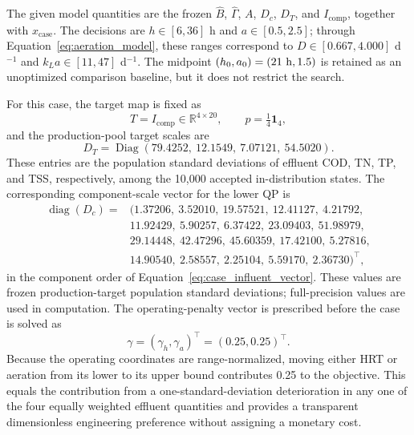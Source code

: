 \documentclass[a4paper,fleqn]{cas-sc}
\newcommand{\R}{\mathbb{R}}
\begin{document}
The given model quantities are the frozen $\widehat B$, $\widehat\Gamma$, $A$, $D_c$, $D_T$, and $I_{\mathrm{comp}}$, together with $x_{\mathrm{case}}$. The decisions are $h\in[6,36]$ h and $a\in[0.5,2.5]$; through Equation~\eqref{eq:aeration_model}, these ranges correspond to $D\in[0.667,4.000]$ d$^{-1}$ and $k_La\in[11,47]$ d$^{-1}$. The midpoint $(h_0,a_0)=(21\ {\rm h},1.5)$ is retained as an unoptimized comparison baseline, but it does not restrict the search.

For this case, the target map is fixed as
\[
T=I_{\mathrm{comp}}\in\R^{4\times20},
\qquad
p=\tfrac14\mathbf1_4,
\]
and the production-pool target scales are
\begin{equation}
\label{eq:case_target_scales}
D_T=\operatorname{Diag}(79.4252,\ 12.1549,\ 7.07121,\ 54.5020).
\end{equation}
These entries are the population standard deviations of effluent COD, TN, TP, and TSS, respectively, among the 10,000 accepted in-distribution states. The corresponding component-scale vector for the lower QP is
\begin{equation}
\label{eq:case_component_scales}
\begin{split}
\operatorname{diag}(D_c)={}&(1.37206,\ 3.52010,\ 19.57521,\ 12.41127,\ 4.21792,\\
&11.92429,\ 5.90257,\ 6.37422,\ 23.09403,\ 51.98979,\\
&29.14448,\ 42.47296,\ 45.60359,\ 17.42100,\ 5.27816,\\
&14.90540,\ 2.58557,\ 2.25104,\ 5.59170,\ 2.36730)^\top,
\end{split}
\end{equation}
in the component order of Equation~\eqref{eq:case_influent_vector}. These values are frozen production-target population standard deviations; full-precision values are used in computation. The operating-penalty vector is prescribed before the case is solved as
\begin{equation}
\label{eq:case_gamma}
\gamma=(\gamma_h,\gamma_a)^\top=(0.25,0.25)^\top.
\end{equation}
Because the operating coordinates are range-normalized, moving either HRT or aeration from its lower to its upper bound contributes 0.25 to the objective. This equals the contribution from a one-standard-deviation deterioration in any one of the four equally weighted effluent quantities and provides a transparent dimensionless engineering preference without assigning a monetary cost.
\end{document}

